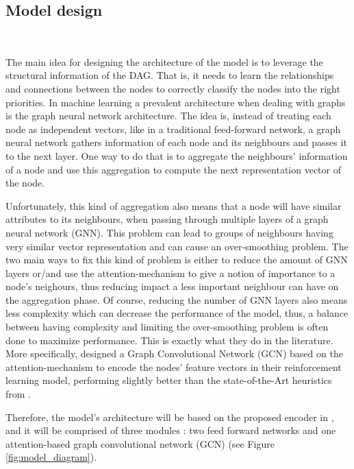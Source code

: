 \subsection{Model design}
~
\label{sec:model_design}

The main idea for designing the architecture of the model is 
to leverage the structural information of the DAG.
That is, it needs to learn the relationships and connections
between the nodes to correctly classify the nodes into the right priorities.
In machine learning a prevalent architecture when dealing with graphs
is the graph neural network architecture.
The idea is, instead of treating each node as independent vectors, like 
in a traditional feed-forward network, 
a graph neural network gathers information of each node and its neighbours 
and passes it to the next layer.
One way to do that is to aggregate the neighbours' information of a node
and use this aggregation to compute the next representation vector of the node.

Unfortunately, this kind of aggregation also means that a node will have similar 
attributes to its neighbours, when passing through multiple layers of a graph neural network (GNN).
This problem can lead to groups of neighbours having very similar vector representation
and can cause an over-smoothing problem\cite{chen2020oversmoothing}.
The two main ways to fix this kind of problem is either to reduce the amount of GNN layers 
or/and use the attention-mechanism to give a notion of importance to a node's neighours,
thus reducing impact a less important neighbour can have on the aggregation phase.
Of course, reducing the number of GNN layers also means less complexity which can decrease the performance of the model,
thus, a balance between having complexity and limiting the over-smoothing problem is often done to maximize performance.
This is exactly what they do in the literature\cite{Lee2021GlobalDagSchedDRL}\cite{Zhao2024GATDRLmodel}.
More specifically, \citet{Lee2021GlobalDagSchedDRL} designed a Graph Convolutional Network (GCN) based on the attention-mechanism
to encode the nodes' feature vectors in their reinforcement learning model, performing slightly better than the state-of-the-Art
heuristics from \citet{zhao2020DAGsched}.

Therefore, the model's architecture will be based on the proposed encoder in \citet{Lee2021GlobalDagSchedDRL},
and it will be comprised of three modules :
two feed forward networks and one attention-based graph convolutional network (GCN) (see Figure \ref{fig:model_diagram}).


